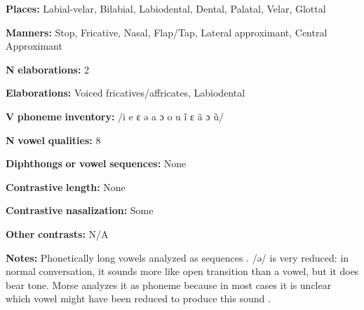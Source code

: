 \documentclass[output=paper]{langsci/langscibook}
\begin{document}
\begin{styleBody}
\textbf{Places:} Labial-velar, Bilabial, Labiodental, Dental, Palatal, Velar, Glottal
\end{styleBody}

\begin{styleBody}
\textbf{Manners:} Stop, Fricative, Nasal, Flap/Tap, Lateral approximant, Central Approximant
\end{styleBody}

\begin{styleBody}
\textbf{N} \textbf{elaborations:} 2
\end{styleBody}

\begin{styleBody}
\textbf{Elaborations:} Voiced fricatives/affricates, Labiodental
\end{styleBody}

\begin{styleBody}
\textbf{V} \textbf{phoneme} \textbf{inventory:} /i e ɛ ə a ɔ o u ĩ ɛ ã ɔ ũ/
\end{styleBody}

\begin{styleBody}
\textbf{N} \textbf{vowel} \textbf{qualities:} 8
\end{styleBody}

\begin{styleBody}
\textbf{Diphthongs} \textbf{or} \textbf{vowel} \textbf{sequences:} None
\end{styleBody}

\begin{styleBody}
\textbf{Contrastive} \textbf{length:} None
\end{styleBody}

\begin{styleBody}
\textbf{Contrastive} \textbf{nasalization:} Some
\end{styleBody}

\begin{styleBody}
\textbf{Other} \textbf{contrasts:} N/A
\end{styleBody}

\begin{styleBody}
\textbf{Notes:} Phonetically long vowels analyzed as sequences \citep[100-105]{Morse1976}. /ə/ is very reduced: in normal conversation, it sounds more like open transition than a vowel, but it does bear tone. Morse analyzes it as phoneme because in most cases it is unclear which vowel might have been reduced to produce this sound \citep[42-5]{Morse1976}.
\end{styleBody}
\end{document}

